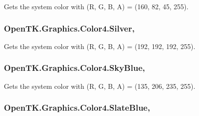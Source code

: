 Gets the system color with (R, G, B, A) = (160, 82, 45, 255). 

\hypertarget{struct_open_t_k_1_1_graphics_1_1_color4_a5d234ac7486cf582beba1c0dc06b7655}{
\subsubsection[{Silver}]{ Open\-T\-K.\-Graphics.\-Color4.\-Silver\hspace{0.3cm}{\ttfamily [static]}, {\ttfamily [get]}}}\label{struct_open_t_k_1_1_graphics_1_1_color4_a5d234ac7486cf582beba1c0dc06b7655}


Gets the system color with (R, G, B, A) = (192, 192, 192, 255). 

\hypertarget{struct_open_t_k_1_1_graphics_1_1_color4_a28948dcbffbf068441050a57616a9ef3}{
\subsubsection[{Sky\-Blue}]{ Open\-T\-K.\-Graphics.\-Color4.\-Sky\-Blue\hspace{0.3cm}{\ttfamily [static]}, {\ttfamily [get]}}}\label{struct_open_t_k_1_1_graphics_1_1_color4_a28948dcbffbf068441050a57616a9ef3}


Gets the system color with (R, G, B, A) = (135, 206, 235, 255). 

\hypertarget{struct_open_t_k_1_1_graphics_1_1_color4_a7960df3427d00c48be53d56356da9e40}{
\subsubsection[{Slate\-Blue}]{ Open\-T\-K.\-Graphics.\-Color4.\-Slate\-Blue\hspace{0.3cm}{\ttfamily [static]}, {\ttfamily [get]}}}\label{struct_open_t_k_1_1_graphics_1_1_color4_a7960df3427d00c48be53d56356da9e40}


